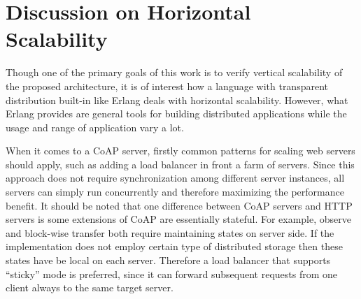 


\section{Discussion on Horizontal Scalability} \label{horizontal_scale_note}

Though one of the primary goals of this work is to verify vertical scalability of the proposed architecture, it is of interest how a language with transparent distribution built-in like Erlang deals with horizontal scalability. However, what Erlang provides are general tools for building distributed applications while the usage and range of application vary a lot. 

When it comes to a CoAP server, firstly common patterns for scaling web servers should apply, such as adding a load balancer in front a farm of servers. Since this approach does not require synchronization among different server instances, all servers can simply run concurrently and therefore maximizing the performance benefit. It should be noted that one difference between CoAP servers and HTTP servers is some extensions of CoAP are essentially stateful. For example, observe and block-wise transfer both require maintaining states on server side. If the implementation does not employ certain type of distributed storage then these states have be local on each server. Therefore a load balancer that supports ``sticky'' mode is preferred, since it can forward subsequent requests from one client always to the same target server. 

